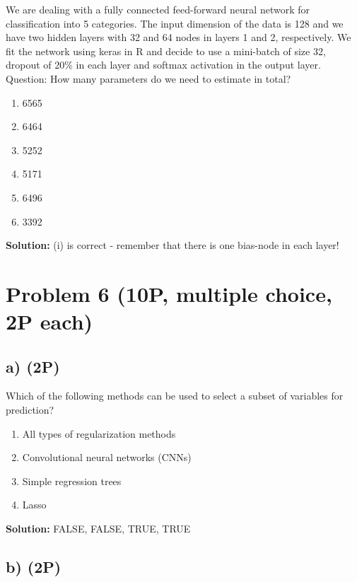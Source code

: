 \documentclass[
]{article}
\providecommand{\tightlist}{%
  \setlength{\itemsep}{0pt}\setlength{\parskip}{0pt}}
\begin{document}
We are dealing with a fully connected feed-forward neural network for
classification into 5 categories. The input dimension of the data is 128
and we have two hidden layers with 32 and 64 nodes in layers 1 and 2,
respectively. We fit the network using keras in R and decide to use a
mini-batch of size 32, dropout of 20\% in each layer and softmax
activation in the output layer. Question: How many parameters do we need
to estimate in total?

\begin{enumerate}
\def\labelenumi{(\roman{enumi})}
\tightlist
\item
  6565
\item
  6464
\item
  5252
\item
  5171
\item
  6496
\item
  3392
\end{enumerate}

\textbf{Solution:} (i) is correct - remember that there is one bias-node
in each layer!

\hypertarget{problem-6-10p-multiple-choice-2p-each}{%
\section{Problem 6 (10P, multiple choice, 2P
each)}\label{problem-6-10p-multiple-choice-2p-each}}

\hypertarget{a-2p-1}{%
\subsection{a) (2P)}\label{a-2p-1}}

Which of the following methods can be used to select a subset of
variables for prediction?

\begin{enumerate}
\def\labelenumi{(\roman{enumi})}
\tightlist
\item
  All types of regularization methods
\item
  Convolutional neural networks (CNNs)
\item
  Simple regression trees
\item
  Lasso
\end{enumerate}

\textbf{Solution:} FALSE, FALSE, TRUE, TRUE

\hypertarget{b-2p}{%
\subsection{b) (2P)}\label{b-2p}}
\end{document}
